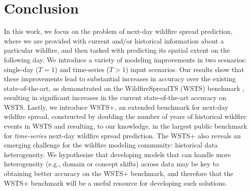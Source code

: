 \section{Conclusion}
\label{sec:conclusion}
In this work, we focus on the problem of next-day wildfire spread prediction, where we are provided with current and/or historical information about a particular wildfire, and then tasked with predicting its spatial extent on the following day.  We introduce a variety of modeling improvements in two scenarios: single-day ($T=1$) and time-series ($T>1$) input scenarios. Our results show that these improvements lead to substantial increases in accuracy over the existing state-of-the-art, as demonstrated on the WildfireSpreadTS (WSTS) benchmark \cite{gerard2023wildfirespreadts}, resulting in significant increases in the current state-of-the-art accuracy on WSTS.  Lastly, we introduce WSTS+, an extended benchmark for next-day wildfire spread, constructed by doubling the number of years of historical wildfire events in WSTS and resulting, to our knowledge, in the largest public benchmark for \textit{time-series} next-day wildfire spread prediction. The WSTS+ also reveals an emerging challenge for the wildfire modeling community: historical data heterogeneity. We hypothesize that developing models that can handle more heterogeneity (e.g., domain or concept shifts) across data may be key to obtaining better accuracy on the WSTS+ benchmark, and therefore that the WSTS+ benchmark will be a useful resource for developing such solutions. 




